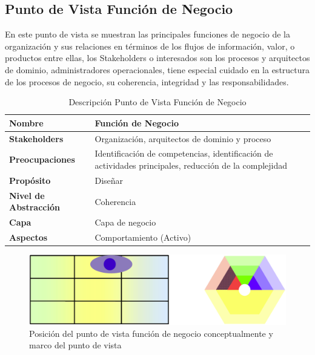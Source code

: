     \subsection{Punto de Vista Función de Negocio}
    En este punto de vista se muestran las principales funciones de negocio de la organización y sus relaciones en términos de los flujos de información, valor, o productos entre  ellas, los Stakeholders o interesados son los procesos y arquitectos de dominio, administradores operacionales, tiene especial cuidado en la estructura de los procesos de  negocio, su coherencia, integridad y las responsabilidades. \cite{ref9}
    \begin{table}[h]
      \centering
      \begin{tabular}{p{3.7cm}p{8cm}}
        \hline
        \textbf{Nombre} & \textbf{Función de Negocio}\\
        \hline
        \textbf{Stakeholders} & Organización, arquitectos de dominio y proceso \\
        \textbf{Preocupaciones} & Identificación de competencias, identificación de actividades principales, reducción de la complejidad \\
        \textbf{Propósito} & Diseñar \\
        \textbf{Nivel de Abstracción} & Coherencia \\
        \textbf{Capa} & Capa de negocio \\
        \textbf{Aspectos} & Comportamiento (Activo) \\
      \end{tabular}
      \caption{Descripción Punto de Vista Función de Negocio}
      \label{Tab:tabla6}
    \end{table}
    \begin{figure}[h]
      \centering
      \includegraphics[scale=0.2]{Imagenes/Figuras/16}
      \caption{Posición del punto de vista función de negocio conceptualmente y marco del punto de vista \cite{ref9}}
      \label{figura16}
    \end{figure}
